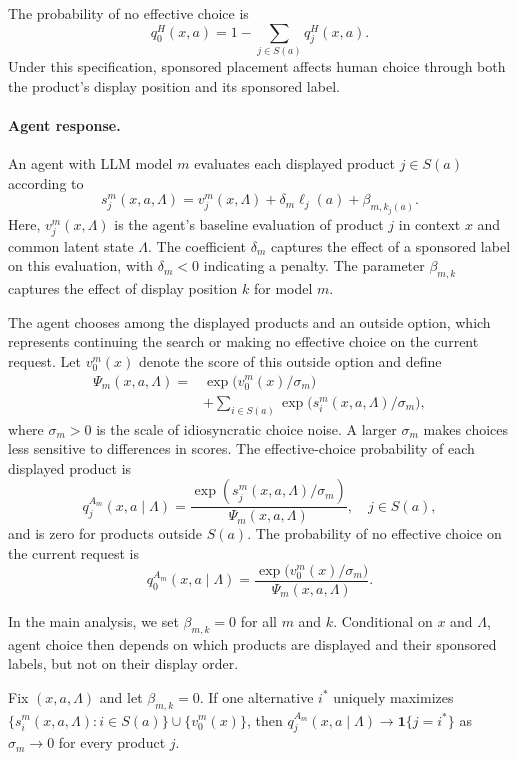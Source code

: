 \documentclass[opre,dblanonrev]{informs4}
\providecommand{\1}{\mathbf{1}}
\begin{document}
The probability of no effective choice is
\[
q_0^H(x,a)=1-\sum_{j\in S(a)}q_j^H(x,a).
\]
Under this specification, sponsored placement affects human choice through both the product's display position and its sponsored label.


\paragraph{Agent response.}
An agent with LLM model $m$ evaluates each displayed product $j\in S(a)$ according to
\[
s_j^m(x,a,\Lambda)
=
v_j^m(x,\Lambda)
+\delta_m\ell_j(a)
+\beta_{m,k_j(a)}.
\]
Here, $v_j^m(x,\Lambda)$ is the agent's baseline evaluation of
product $j$ in context $x$ and common latent state $\Lambda$.
The coefficient $\delta_m$ captures the effect of a sponsored
label on this evaluation, with $\delta_m<0$ indicating a penalty.
The parameter $\beta_{m,k}$ captures the effect of display
position $k$ for model $m$.

The agent chooses among the displayed products and an outside
option, which represents continuing the search or making no
effective choice on the current request.
Let $v_0^m(x)$ denote the score of this outside option and define
\[
\begin{aligned}
\Psi_m(x,a,\Lambda) = & \exp\bigl(v_0^m(x)/\sigma_m\bigr) \\
& + \sum _ {i \in S(a) } \exp \bigl (s_i^m(x,a, \Lambda )/ \sigma _m \bigr ),
\end{aligned}
\]
where $\sigma_m>0$ is the scale of idiosyncratic choice noise.
A larger $\sigma_m$ makes choices less sensitive to differences
in scores.
The effective-choice probability of each displayed product is
\begin{equation}\label{eq:agent-logit}
q_j^{A_m}(x,a\mid\Lambda)
=
{\textstyle \frac{\exp(s_j^m(x,a,\Lambda)/\sigma_m)}{\Psi_m(x,a,\Lambda)}},
\quad j\in S(a),
\end{equation}
and is zero for products outside $S(a)$.
The probability of no effective choice on the current request is
\[
q_0^{A_m}(x,a\mid\Lambda)
=
\frac{\exp\bigl(v_0^m(x)/\sigma_m\bigr)}
     {\Psi_m(x,a,\Lambda)}.
\]

In the main analysis, we set $\beta_{m,k}=0$ for all $m$ and $k$.
Conditional on $x$ and $\Lambda$, agent choice then depends on
which products are displayed and their sponsored labels,
but not on their display order.

\begin{lemma}\label{lem:small-noise}
Fix $(x,a,\Lambda)$ and let $\beta_{m,k}=0$. If one alternative $i^\ast$ uniquely maximizes $\{s_i^m(x,a,\Lambda):i\in S(a)\}\cup\{v_0^m(x)\}$, then $q_j^{A_m}(x,a\mid\Lambda)\to\1\{j=i^\ast\}$ as $\sigma_m\to0$ for every product $j$.
\end{lemma}
\end{document}
